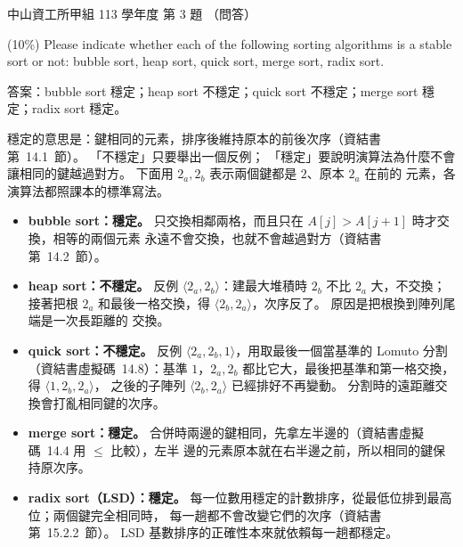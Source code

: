 \begin{pastexam}[label={px:nsysu-113-osds-03}]{中山資工所甲組 113 學年度 第 3 題}
（問答）

(10\%) Please indicate whether each of the following sorting algorithms is a stable sort or not:
bubble sort, heap sort, quick sort, merge sort, radix sort.
\end{pastexam}

\begin{pastsoln}
答案：bubble sort 穩定；heap sort 不穩定；quick sort 不穩定；merge sort 穩定；radix sort 穩定。

穩定的意思是：鍵相同的元素，排序後維持原本的前後次序（資結書第~14.1~節）。 「不穩定」只要舉出一個反例；
「穩定」要說明演算法為什麼不會讓相同的鍵越過對方。 下面用 $2_a, 2_b$ 表示兩個鍵都是 $2$、原本 $2_a$ 在前的
元素，各演算法都照課本的標準寫法。
\begin{itemize}
\item \textbf{bubble sort：穩定。} 只交換相鄰兩格，而且只在 $A[j] > A[j+1]$ 時才交換，相等的兩個元素
永遠不會交換，也就不會越過對方（資結書第~14.2~節）。
\item \textbf{heap sort：不穩定。} 反例 $\langle 2_a, 2_b \rangle$：建最大堆積時 $2_b$ 不比 $2_a$ 大，不交換；
接著把根 $2_a$ 和最後一格交換，得 $\langle 2_b, 2_a \rangle$，次序反了。 原因是把根換到陣列尾端是一次長距離的
交換。
\item \textbf{quick sort：不穩定。} 反例 $\langle 2_a, 2_b, 1 \rangle$，用取最後一個當基準的 Lomuto 分割
（資結書虛擬碼~14.8）：基準 $1$，$2_a, 2_b$ 都比它大，最後把基準和第一格交換，得 $\langle 1, 2_b, 2_a \rangle$，
之後的子陣列 $\langle 2_b, 2_a \rangle$ 已經排好不再變動。 分割時的遠距離交換會打亂相同鍵的次序。
\item \textbf{merge sort：穩定。} 合併時兩邊的鍵相同，先拿左半邊的（資結書虛擬碼~14.4 用 $\le$ 比較），左半
邊的元素原本就在右半邊之前，所以相同的鍵保持原次序。
\item \textbf{radix sort（LSD）：穩定。} 每一位數用穩定的計數排序，從最低位排到最高位；兩個鍵完全相同時，
每一趟都不會改變它們的次序（資結書第~15.2.2~節）。 LSD 基數排序的正確性本來就依賴每一趟都穩定。
\end{itemize}
\end{pastsoln}
